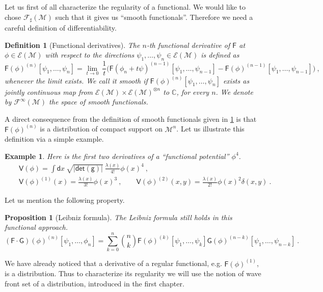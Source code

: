 \documentclass[11pt]{book}
\newcommand{\abs}[1]{\left|#1\right|}
\renewcommand{\det}{\mathsf{det}}
\newcommand{\Ecal}{\mathcal{E}}
\newcommand{\Fcal}{\mathcal{F}}
\newcommand{\Mcal}{\mathcal{M}}
\newcommand{\Cbb}{\mathbb{C}}
\newcommand{\Fsf}{\mathsf{F}}
\newcommand{\Gsf}{\mathsf{G}}
\newcommand{\Vsf}{\mathsf{V}}
\newcommand{\dsf}{\mathsf{d}}
\newcommand{\gsf}{\mathsf{g}}
\theoremstyle{break}
\newtheorem{proposition}{Proposition}
\newtheorem{example}{Example}
\newtheorem{definition}{Definition}
\begin{document}


\bigskip

Let us first of all characterize the regularity of a functional. We would like to chose $\Fcal_\sharp(\Mcal)$ such that it gives us ``smooth functionals''. Therefore we need a careful definition of differentiability.%
%
\begin{definition}[Functional derivatives] \label{def:func-deriv}
The $n$-th functional derivative of $\Fsf$ at $\phi\in\Ecal(\Mcal)$ with respect to the directions $\psi_1, \dots, \psi_n \in\Ecal(\Mcal)$ is defined as%
%
\begin{equation*}%
\Fsf(\phi)^{(n)}[\psi_1,\dots ,\psi_n] = \lim_{t \to 0} \ \frac{1}{t} \bigg( \Fsf(\phi_n + t \psi)^{(n-1)}[\psi_1,\dots ,\psi_{n-1}] - \Fsf(\phi)^{(n-1)}[\psi_1,\dots ,\psi_{n-1}] \bigg) \ ,
\end{equation*}
%
whenever the limit exists. We call it smooth if $\Fsf(\phi)^{(n)}[\psi_1,\dots ,\psi_n]$ exists as jointly continuous map from $\Ecal(\Mcal) \times \Ecal(\Mcal)^{\otimes n}$ to $\Cbb$, for every $n$. We denote by $\Fcal^\infty(\Mcal)$ the space of smooth functionals.


\end{definition}
%
A direct consequence from the definition of smooth functionals given in \ref{def:func-deriv} is that $\Fsf(\phi)^{(n)}$ is a distribution of compact support on $\Mcal^n$.  Let us illustrate this definition via a simple example.%
\begin{example}
%
Here is the first two derivatives of a ``functional potential'' $\phi^4$. 
%
\begin{eqnarray*}
&& \Vsf(\phi) = \int \dsf x \ \sqrt{\abs{\det(\gsf)}} \ \frac{\lambda(x)}{4!} \phi(x)^4 \ ,\\
%
&& \Vsf(\phi)^{(1)}(x) = \frac{\lambda(x)}{3!} \phi(x)^3 \ , \qquad
%
\Vsf(\phi)^{(2)}(x,y) = \frac{\lambda(x)}{2!} \phi(x)^2 \delta(x,y) \ .
\end{eqnarray*}
%
\end{example}
%
Let us mention the following property.
%
\begin{proposition}[Leibniz formula]
The Leibniz formula still holds in this functional approach.
%
\begin{equation*}
\left(\Fsf \cdot \Gsf\right)(\phi)^{(n)}[\psi_1, \dots ,\phi_n] = \sum_{k=0}^{n} \binom{n}{k} \Fsf(\phi)^{(k)}[\psi_1, \dots , \psi_k] \Gsf(\phi)^{(n-k)}[\psi_1, \dots , \psi_{n-k}] \ .
\end{equation*}
%
\end{proposition}
%
%
We have already noticed that a derivative of a regular functional, e.g. $\Fsf(\phi)^{(1)}$, is a distribution. Thus to characterize its regularity we will use the notion of wave front set of a distribution, introduced in the first chapter.%
\end{document}
